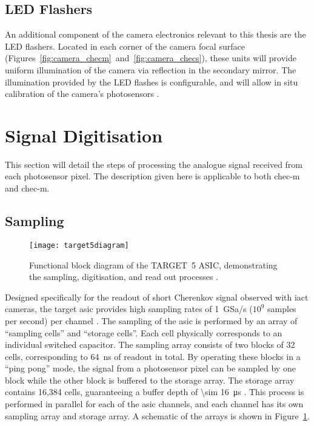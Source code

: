 \subsection{LED Flashers}

An additional component of the camera electronics relevant to this thesis are the LED flashers. Located in each corner of the camera focal surface (Figures~\ref{fig:camera_checm}~and~\ref{fig:camera_checs}), these units will provide uniform illumination of the camera via reflection in the secondary mirror. The illumination provided by the LED flashes is configurable, and will allow in situ calibration of the camera's photosensors \cite{Brown2016a}.

\section{Signal Digitisation}

This section will detail the steps of processing the analogue signal received from each photosensor pixel. The description given here is applicable to both \gls{chec-m} and \gls{chec-m}.

\subsection{Sampling}

\begin{figure}
	\centering\texttt{[image: target5diagram]} 
	\caption[Functional block diagram of the TARGET~5 ASIC.]{Functional block diagram of the TARGET~5 ASIC, demonstrating the sampling, digitisation, and read out processes \cite{Albert2017}.}
	\label{fig:target5diagram}
\end{figure}

Designed specifically for the readout of short Cherenkov signal observed with \gls{iact} cameras, the \gls{target} \gls{asic} provides high sampling rates of \SI{1}{GSa/s} ($10^9$ samples per second) per channel \cite{Funk2017}. The sampling of the \gls{asic} is performed by an array of ``sampling cells'' and ``storage cells''. Each cell physically corresponds to an individual switched capacitor. The sampling array consists of two blocks of 32 cells, corresponding to \SI{64}{ns} of readout in total. By operating these blocks in a ``ping pong'' mode, the signal from a photosensor pixel can be sampled by one block while the other block is buffered to the storage array. The storage array contains 16,384 cells, guaranteeing a buffer depth of \SI{\sim 16}{\micro s} \cite{Funk2017}. This process is performed in parallel for each of the \gls{asic} channels, and each channel has its own sampling array and storage array. A schematic of the arrays is shown in Figure~\ref{fig:target5diagram}.

